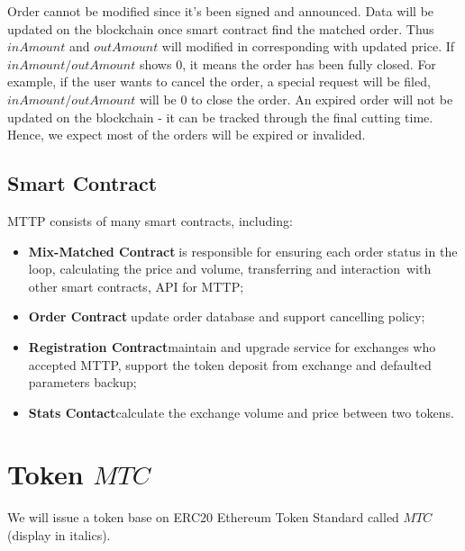 \documentclass[UTF8,nofonts]{article}
\begin{document}
Order cannot be modified since it’s been signed and announced. Data will be updated on the blockchain once smart contract find the matched order. Thus $inAmount$ and $outAmount$ will modified in corresponding with updated price. If $inAmount / outAmount$ shows 0,  it means the order has been fully closed. For example,  if the user wants to cancel the order,  a special request will be filed,  $inAmount / outAmount$ will be 0 to close the order. An expired order will not be updated on the blockchain - it can be tracked through the final cutting time. Hence,  we expect most of the orders will be expired or invalided.

\subsection{Smart Contract\label{sec: contracts}}

MTTP consists of many smart contracts,  including:

\begin{itemize}
 \item \textbf{Mix-Matched Contract}is responsible for ensuring each order status in the loop,  calculating the price and volume,  transferring and interaction with other smart contracts,  API for MTTP;
 \item  \textbf{Order Contract}update order database and support cancelling policy;
 \item \textbf{Registration Contract}maintain and upgrade service for exchanges who accepted MTTP,  support the token deposit from exchange and defaulted parameters backup;
 \item \textbf{Stats Contact}calculate the exchange volume and price between two tokens.

\end{itemize}

\section{Token $MTC$ \label{sec: protocoltoken}}


We will issue a token base on ERC20 Ethereum Token Standard called $MTC$(display in italics).
\end{document}
